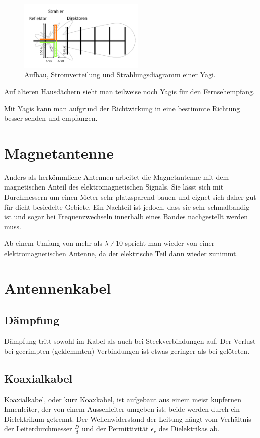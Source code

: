 \begin{figure}[h!]
 \centering
 \includegraphics[width=6cm]{./png/Amfu-Yagi.png}
 \caption{Aufbau, Stromverteilung und Strahlungsdiagramm einer Yagi.}
 \label{fig:yagi}
\end{figure}

Auf älteren Hausdächern sieht man teilweise noch Yagis für den Fernsehempfang.

Mit Yagis kann man aufgrund der Richtwirkung in eine bestimmte Richtung besser senden und empfangen. 

\section{Magnetantenne}
Anders als herkömmliche Antennen arbeitet die Magnetantenne mit dem magnetischen Anteil des elektromagnetischen Signals. Sie lässt sich mit Durchmessern um einen Meter sehr platzsparend bauen und eignet sich daher gut für dicht besiedelte Gebiete. Ein Nachteil ist jedoch, dass sie sehr schmalbandig ist und sogar bei Frequenzwechseln innerhalb eines Bandes nachgestellt werden muss.

Ab einem Umfang von mehr als $\lambda∕10$ spricht man wieder von einer elektromagnetischen Antenne, da der elektrische Teil dann wieder zunimmt.

\section{Antennenkabel}
\subsection{Dämpfung}
Dämpfung tritt sowohl im Kabel als auch bei Steckverbindungen auf. Der Verlust bei gecrimpten (geklemmten) Verbindungen ist etwas geringer als bei gelöteten.

\subsection{Koaxialkabel}\label{koax}
Koaxialkabel, oder kurz Koaxkabel, ist aufgebaut aus einem meist kupfernen Innenleiter, der von einem Aussenleiter umgeben ist; beide werden durch ein Dielektrikum getrennt. Der Wellenwiderstand der Leitung hängt vom Verhältnis der Leiterdurchmesser $\frac{D}{d}$ und der Permittivität $\epsilon_r$ des Dielektrikas ab.

